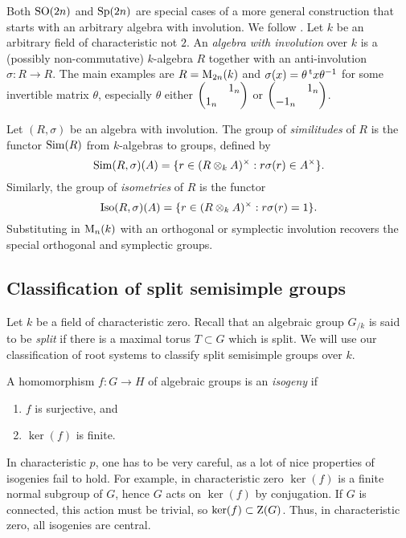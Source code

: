 \begin{hard}
Both $\operatorname{SO}(2n)$ and $\operatorname{Sp}(2n)$ are special cases of a more general construction 
that starts with an arbitrary algebra with involution. We follow 
\cite[VIII.21]{berhuy-2010}. Let $k$ be an arbitrary field of characteristic 
not $2$. An \emph{algebra with involution} over $k$ is a (possibly 
non-commutative) $k$-algebra $R$ together with an anti-involution 
$\sigma:R\to R$. The main examples are $R=\operatorname{M}_{2n}(k)$ and 
$\sigma(x) = \theta \prescript{\mathrm{t}}{}{x} \theta^{-1}$ for some invertible matrix 
$\theta$, especially $\theta$ either $\begin{pmatrix}  & 1_n \\ 1_n &  \end{pmatrix}$ or 
$\begin{pmatrix}  & 1_n \\ -1_n &  \end{pmatrix}$. 

Let $(R,\sigma)$ be an algebra with involution. The group of 
\emph{similitudes} of $R$ is the functor $\operatorname{Sim}(R)$ from $k$-algebras to 
groups, defined by 
\[
  \operatorname{Sim}(R,\sigma)(A) = \{r\in (R\otimes_k A)^\times:r\sigma(r)\in A^\times\} .
\]
Similarly, the group of \emph{isometries} of $R$ is the functor 
\[
  \operatorname{Iso}(R,\sigma)(A) =  \{r\in (R\otimes_k A)^\times:r\sigma(r)=1\} .
\]
Substituting in $\operatorname{M}_n(k)$ with an orthogonal or symplectic involution 
recovers the special orthogonal and symplectic groups. 
\end{hard}





\subsection{Classification of split semisimple groups}

Let $k$ be a field of characteristic zero. Recall that an algebraic group 
$G_{/k}$ is said to be \emph{split} if there is a maximal torus $T\subset G$ 
which is split. We will use our classification of root systems to classify 
split semisimple groups over $k$. 

\begin{definition}
A homomorphism $f:G\to H$ of algebraic groups is an \emph{isogeny} if 
\begin{enumerate}
  \item $f$ is surjective, and 
  \item $\ker(f)$ is finite. 
\end{enumerate}
\end{definition}

In characteristic $p$, one has to be very careful, as a lot of nice properties 
of isogenies fail to hold. For example, in characteristic zero $\ker(f)$ is a 
finite normal subgroup of $G$, hence $G$ acts on $\ker(f)$ by conjugation. If 
$G$ is connected, this action must be trivial, so $\ker(f)\subset \operatorname{Z}(G)$. 
Thus, in characteristic zero, all isogenies are central. 


